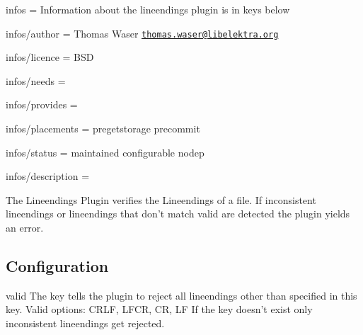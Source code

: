 
\begin{DoxyItemize}
\item infos = Information about the lineendings plugin is in keys below
\item infos/author = Thomas Waser \href{mailto:thomas.waser@libelektra.org}{\tt thomas.\+waser@libelektra.\+org}
\item infos/licence = B\+S\+D
\item infos/needs =
\item infos/provides =
\item infos/placements = pregetstorage precommit
\item infos/status = maintained configurable nodep
\item infos/description =
\end{DoxyItemize}

The Lineendings Plugin verifies the Lineendings of a file. If inconsistent lineendings or lineendings that don't match {\ttfamily valid} are detected the plugin yields an error.

\subsection*{Configuration}

{\ttfamily valid} The key tells the plugin to reject all lineendings other than specified in this key. Valid options\+: C\+R\+L\+F, L\+F\+C\+R, C\+R, L\+F If the key doesn't exist only inconsistent lineendings get rejected. 